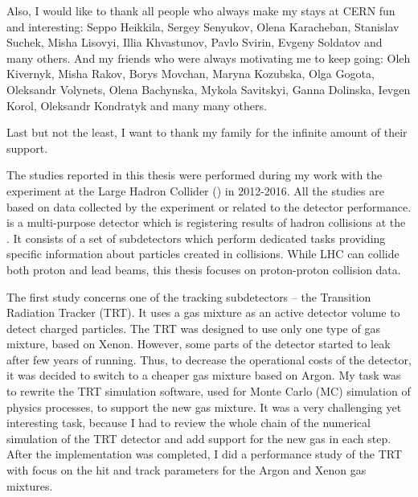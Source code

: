 \begin{acknowledgements}
Also, I would like to thank all people who always make my stays at CERN fun and interesting: Seppo Heikkila, Sergey Senyukov, Olena Karacheban, Stanislav Suchek, Misha Lisovyi, Illia Khvastunov, Pavlo Svirin, Evgeny Soldatov and many others.
And my friends who were always motivating me to keep going: Oleh Kivernyk, Misha Rakov, Borys Movchan, Maryna Kozubska, Olga Gogota, Oleksandr Volynets, Olena Bachynska, Mykola Savitskyi, Ganna Dolinska, Ievgen Korol, Oleksandr Kondratyk and many many others.

Last but not the least, I want to thank my family for the infinite amount of their support.
  
\end{acknowledgements}


\begin{preface}

The studies reported in this thesis were performed during my work with the \ATLAS experiment at the Large Hadron Collider (\LHC) in 2012-2016. All the studies are based on data collected by the \ATLAS experiment or related to the \ATLAS detector performance.
\ATLAS is a multi-purpose detector which is registering results of hadron collisions at the \LHC. It consists of a set of subdetectors which perform dedicated tasks providing specific information about particles created in collisions.
While LHC can collide both proton and lead beams, this thesis focuses on proton-proton collision data.

The first study concerns one of the \ATLAS tracking subdetectors -- the Transition Radiation Tracker (TRT).
It uses a gas mixture as an active detector volume to detect charged particles. The TRT was designed to use only one type of gas mixture, based on Xenon. However, some parts of the detector started to leak after few years of running. Thus, to decrease the operational costs of the detector, it was decided to switch to a cheaper gas mixture based on Argon. My task was to rewrite the TRT simulation software, used for Monte Carlo (MC) simulation of physics processes, to support the new gas mixture. It was a very challenging yet interesting task, because I had to review the whole chain of the numerical simulation of the TRT detector and add support for the new gas in each step. After the implementation was completed, I did a performance study of the TRT with focus on the hit and track parameters for the Argon and Xenon gas mixtures.


\end{preface}
